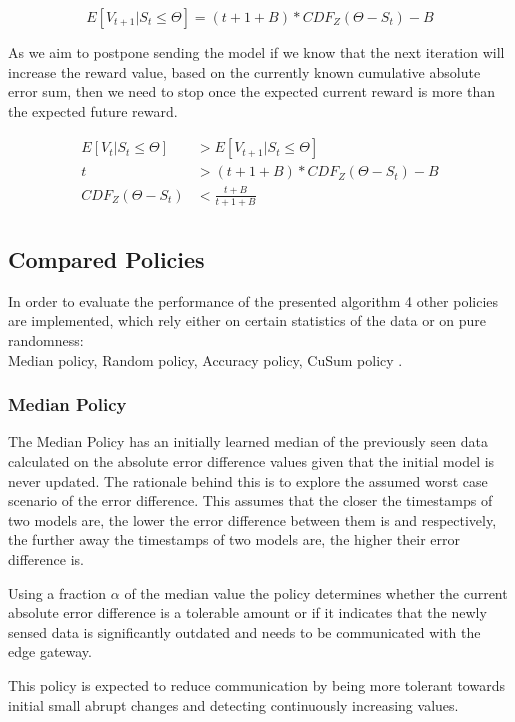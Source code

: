 \documentclass{mpaper}
\begin{document}
\begin{equation}
    E[V_{t+1}|S_t\leq\Theta] = (t+1+B)*CDF_{Z}(\Theta - S_t) - B
\end{equation}

As we aim to postpone sending the model if we know that the next iteration will increase the reward value, based on the currently known cumulative absolute error sum, then we need to stop once the expected current reward is more than the expected future reward.

\begin{align*}
    E[V_{t}|S_t\leq\Theta] &> E[V_{t+1}|S_t\leq\Theta]\\
    t &> (t+1+B)*CDF_{Z}(\Theta - S_t) - B\\
    CDF_{Z}(\Theta - S_t) &< \frac{t+B}{t+1+B}\\
\end{align*}

\subsection{Compared Policies}

In order to evaluate the performance of the presented algorithm 4 other policies are implemented, which rely either on certain statistics of the data or on pure randomness:\\
Median policy, Random policy, Accuracy policy, CuSum policy \cite{cusum_pierre}.

\subsubsection{Median Policy}

The Median Policy has an initially learned median of the previously seen data calculated on the absolute error difference values given that the initial model is never updated. 
The rationale behind this is to explore the assumed worst case scenario of the error difference. This assumes that the closer the timestamps of two models are, the lower the error difference between them is and respectively, the further away the timestamps of two models are, the higher their error difference is.

Using a fraction $\alpha$ of the median value the policy determines whether the current absolute error difference is a tolerable amount or if it indicates that the newly sensed data is significantly outdated and needs to be communicated with the edge gateway.

This policy is expected to reduce communication by being more tolerant towards initial small abrupt changes and detecting continuously increasing values.
\end{document}
